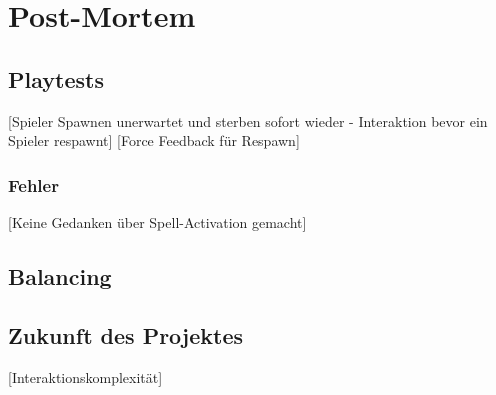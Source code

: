\chapter{Post-Mortem}

\section{Playtests}

[Spieler Spawnen unerwartet und sterben sofort wieder - Interaktion bevor ein Spieler respawnt]
[Force Feedback für Respawn]

\subsection{Fehler}

[Keine Gedanken über Spell-Activation gemacht]

\section{Balancing}

\section{Zukunft des Projektes}
[Interaktionskomplexität]